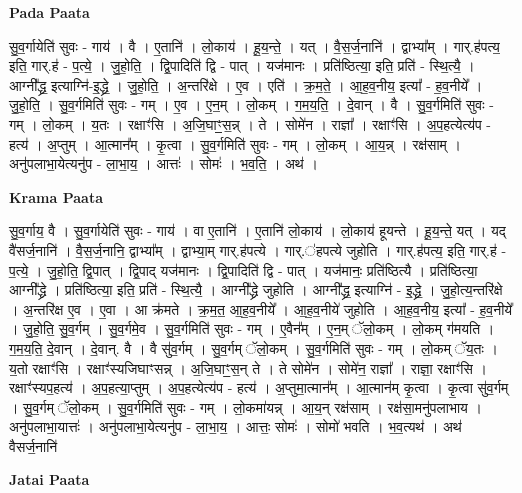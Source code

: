 \documentclass[17pt]{extarticle}
\begin{document}
\textbf{Pada Paata} \newline

सु॒व॒र्गायेति॑ सुवः - गाय॑ । वै । ए॒तानि॑ । लो॒काय॑ । हू॒य॒न्ते॒ । यत् । वै॒स॒र्ज॒नानि॑ । द्वाभ्या᳚म् । गार्.ह॑पत्य॒ इति॒ गार्.ह॑ - प॒त्ये॒ । जु॒हो॒ति॒ । द्वि॒पादिति॑ द्वि - पात् । यज॑मानः । प्रति॑ष्ठित्या॒ इति॒ प्रति॑ - स्थि॒त्यै॒ । आग्नी᳚द्ध्र॒ इत्याग्नि॑-इ॒द्ध्रे॒ । जु॒हो॒ति॒ । अ॒न्तरि॑क्षे । ए॒व । एति॑ । क्र॒म॒ते॒ । आ॒ह॒व॒नीय॒ इत्या᳚ - ह॒व॒नीये᳚ । जु॒हो॒ति॒ । सु॒व॒र्गमिति॑ सुवः - गम् । ए॒व । ए॒न॒म् । लो॒कम् । ग॒म॒य॒ति॒ । दे॒वान् । वै । सु॒व॒र्गमिति॑ सुवः - गम् । लो॒कम् । य॒तः । रक्षाꣳ॑सि । अ॒जि॒घाꣳ॒॒स॒न्न् । ते । सोमे॑न । राज्ञा᳚ । रक्षाꣳ॑सि । अ॒प॒हत्येत्य॑प - हत्य॑ । अ॒प्तुम् । आ॒त्मान᳚म् । कृ॒त्वा । सु॒व॒र्गमिति॑ सुवः - गम् । लो॒कम् । आ॒य॒न्न् । रक्ष॑साम् । अनु॑पलाभा॒येत्यनु॑प - ला॒भा॒य॒ । आत्तः॑ । सोमः॑ । भ॒व॒ति॒ । अथ॑ ।  \newline


\textbf{Krama Paata} \newline

सु॒व॒र्गाय॒ वै । सु॒व॒र्गायेति॑ सुवः - गाय॑ । वा ए॒तानि॑ । ए॒तानि॑ लो॒काय॑ । लो॒काय॑ हूयन्ते । हू॒य॒न्ते॒ यत् । यद् वै॑सर्ज॒नानि॑ । वै॒स॒र्ज॒नानि॒ द्वाभ्या᳚म् । द्वाभ्या॒म् गार्.ह॑पत्ये । गार्.॑हपत्ये जुहोति । गार्.ह॑पत्य॒ इति॒ गार्.ह॑ - प॒त्ये॒ । जु॒हो॒ति॒ द्वि॒पात् । द्वि॒पाद् यज॑मानः । द्वि॒पादिति॑ द्वि - पात् । यज॑मानः॒ प्रति॑ष्ठित्यै । प्रति॑ष्ठित्या॒ आग्नी᳚द्ध्रे । प्रति॑ष्ठित्या॒ इति॒ प्रति॑ - स्थि॒त्यै॒ । आग्नी᳚द्ध्रे जुहोति । आग्नी᳚द्ध्र॒ इत्याग्नि॑ - इ॒द्ध्रे॒ । जु॒हो॒त्य॒न्तरि॑क्षे । अ॒न्तरि॑क्ष ए॒व । ए॒वा । आ क्र॑मते । क्र॒म॒त॒ आ॒ह॒व॒नीये᳚ । आ॒ह॒व॒नीये॑ जुहोति । आ॒ह॒व॒नीय॒ इत्या᳚ - ह॒व॒नीये᳚ । जु॒हो॒ति॒ सु॒व॒र्गम् । सु॒व॒र्गमे॒व । सु॒व॒र्गमिति॑ सुवः - गम् । ए॒वैन᳚म् । ए॒न॒म् ॅलो॒कम् । लो॒कम् ग॑मयति । ग॒म॒य॒ति॒ दे॒वान् । दे॒वान्. वै । वै सु॑व॒र्गम् । सु॒व॒र्गम् ॅलो॒कम् । सु॒व॒र्गमिति॑ सुवः - गम् । लो॒कम् ॅय॒तः । य॒तो रक्षाꣳ॑सि । रक्षाꣳ॑स्यजिघाꣳसन्न् । अ॒जि॒घाꣳ॒॒स॒न् ते । ते सोमे॑न । सोमे॑न॒ राज्ञा᳚ । राज्ञा॒ रक्षाꣳ॑सि । रक्षाꣳ॑स्यप॒हत्य॑ । अ॒प॒हत्या॒प्तुम् । अ॒प॒हत्येत्य॑प - हत्य॑ । अ॒प्तुमा॒त्मान᳚म् । आ॒त्मान॑म् कृ॒त्वा । कृ॒त्वा सु॑व॒र्गम् । सु॒व॒र्गम् ॅलो॒कम् । सु॒व॒र्गमिति॑ सुवः - गम् । लो॒कमा॑यन्न् । आ॒य॒न् रक्ष॑साम् । रक्ष॑सा॒मनु॑पलाभाय । अनु॑पलाभा॒यात्तः॑ । अनु॑पलाभा॒येत्यनु॑प - ला॒भा॒य॒ । आत्तः॒ सोमः॑ । सोमो॑ भवति । भ॒व॒त्यथ॑ । अथ॑ वैसर्ज॒नानि॑ \newline

\textbf{Jatai Paata} \newline
\end{document}
